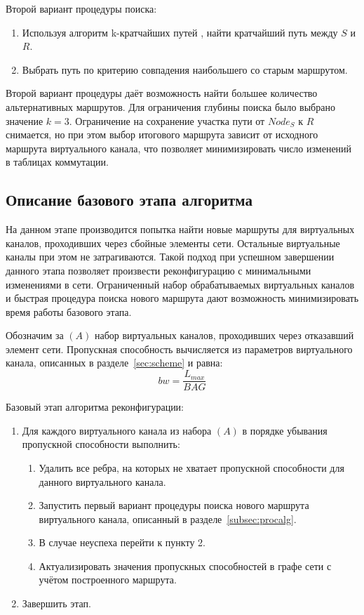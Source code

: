 \documentclass[12pt, a4paper]{article}
\begin{document}
Второй вариант процедуры поиска:
\begin{enumerate}
	\item Используя алгоритм k-кратчайших путей \cite{kshort}, найти кратчайший путь между $S$ и $R$.
	\item Выбрать путь по критерию совпадения наибольшего со старым маршрутом.
\end{enumerate}

Второй вариант процедуры даёт возможность найти большее количество альтернативных маршрутов. Для ограничения глубины поиска было выбрано значение $k = 3$. Ограничение на сохранение участка пути от $Node_{S}$ к $R$ снимается, но при этом выбор итогового маршрута зависит от исходного маршрута виртуального канала, что позволяет минимизировать число изменений в таблицах коммутации.

\subsection{Описание базового этапа алгоритма}

На данном этапе производится попытка найти новые маршруты для виртуальных каналов, проходивших через сбойные элементы сети. Остальные виртуальные каналы при этом не затрагиваются. Такой подход при успешном завершении данного этапа позволяет произвести реконфигурацию с минимальными изменениями в сети. Ограниченный набор обрабатываемых виртуальных каналов и быстрая процедура поиска нового маршрута дают возможность минимизировать время работы базового этапа.

Обозначим за $(A)$ набор виртуальных каналов, проходивших через отказавший элемент сети. Пропускная способность вычисляется из параметров виртуального канала, описанных в разделе~\ref{sec:scheme} и равна:
$$bw = \frac{L_{max}}{BAG}$$

Базовый этап алгоритма реконфигурации:
\begin{enumerate}
	\item Для каждого виртуального канала из набора $(A)$ в порядке убывания пропускной способности выполнить:
	\begin{enumerate}
	\item Удалить все ребра, на которых не хватает пропускной способности для данного виртуального канала.
	\item Запустить первый вариант процедуры поиска нового маршрута виртуального канала, описанный в разделе~\ref{subsec:procalg}.
	\item В случае неуспеха перейти к пункту 2.
	\item Актуализировать значения пропускных способностей в графе сети с учётом построенного маршрута.
	\end{enumerate}
	\item Завершить этап.
\end{enumerate}
\end{document}
